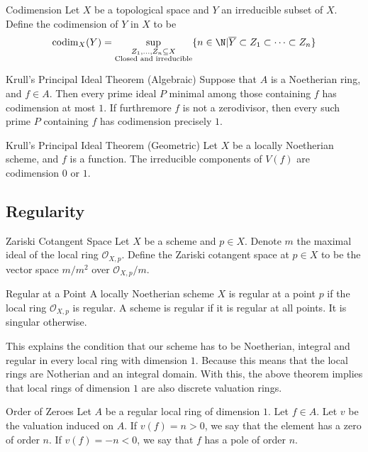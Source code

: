 \documentclass[a4paper]{article}
\begin{document}
\begin{defn}{Codimension}{} Let $X$ be a topological space and $Y$ an irreducible subset of $X$. Define the codimension of $Y$ in $X$ to be $$\text{codim}_X(Y)=\sup_{\substack{Z_1,\dots,Z_n\subseteq X\\\text{Closed and irreducible}}}\{n\in\N|\overline{Y}\subset Z_1\subset\dots\subset Z_n\}$$
\end{defn}

\begin{thm}{Krull's Principal Ideal Theorem (Algebraic)}{} Suppose that $A$ is a Noetherian ring, and $f\in A$. Then every prime ideal $P$ minimal among those containing $f$ has codimension at most $1$. If furthremore $f$ is not a zerodivisor, then every such prime $P$ containing $f$ has codimension precisely $1$. 
\end{thm}

\begin{thm}{Krull's Principal Ideal Theorem (Geometric)}{} Let $X$ be a locally Noetherian scheme, and $f$ is a function. The irreducible components of $V(f)$ are codimension $0$ or $1$. 
\end{thm}

\subsection{Regularity}
\begin{defn}{Zariski Cotangent Space}{} Let $X$ be a scheme and $p\in X$. Denote $m$ the maximal ideal of the local ring $\mathcal{O}_{X,p}$. Define the Zariski cotangent space at $p\in X$ to be the vector space $m/m^2$ over $\mathcal{O}_{X,p}/m$. 
\end{defn}

\begin{defn}{Regular at a Point}{} A locally Noetherian scheme $X$ is regular at a point $p$ if the local ring $\mathcal{O}_{X,p}$ is regular. A scheme is regular if it is regular at all points. It is singular otherwise. 
\end{defn}

This explains the condition that our scheme has to be Noetherian, integral and regular in every local ring with dimension $1$. Because this means that the local rings are Notherian and an integral domain. With this, the above theorem implies that local rings of dimension $1$ are also discrete valuation rings. 

\begin{defn}{Order of Zeroes}{} Let $A$ be a regular local ring of dimension $1$. Let $f\in A$. Let $v$ be the valuation induced on $A$. If $v(f)=n>0$, we say that the element has a zero of order $n$. If $v(f)=-n<0$, we say that $f$ has a pole of order $n$. 
\end{defn}
\end{document}
